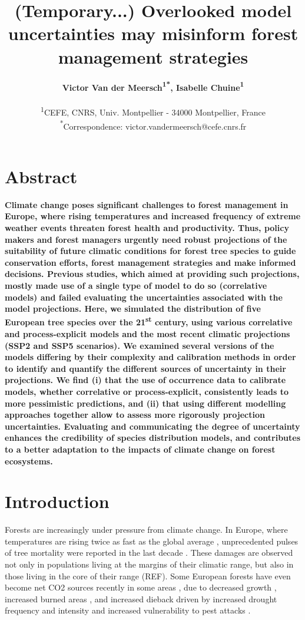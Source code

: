 \documentclass[letterpaper,8pt]{extarticle}  %
\title{(Temporary...) Overlooked model uncertainties may misinform forest management strategies}
\author{%
\textbf{Victor Van der Meersch\textcolor{Accent}{\textsuperscript{1*}}, %
Isabelle Chuine\textcolor{Accent}{\textsuperscript{1}} %
}\\
\begin{small}\textcolor{Accent}{\textsuperscript{1}}CEFE, CNRS, Univ. Montpellier - 34000 Montpellier, France \\ 
\textcolor{Accent}{\textsuperscript{*}}Correspondence: \textcolor{Accent}{victor.vandermeersch@cefe.cnrs.fr} \\ \end{small}
}
\date{}
\begin{document}
\maketitle

\section*{Abstract}

\begin{doublespacing}
\begin{linenumbers}

\noindent
\textbf{Climate change poses significant challenges to forest management in Europe, where rising temperatures and increased frequency of extreme weather events threaten forest health and productivity. Thus, policy makers and forest managers urgently need robust projections of the suitability of future climatic conditions for forest tree species to guide conservation efforts, forest management strategies and make informed decisions. Previous studies, which aimed at providing such projections, mostly made use of a single type of model to do so (correlative models) and failed evaluating the uncertainties associated with the model projections. Here, we simulated the distribution of five European tree species over the 21\textsuperscript{st} century, using various correlative and process-explicit models and the most recent climatic projections (SSP2 and SSP5 scenarios). We examined several versions of the models differing by their complexity and calibration methods in order to identify and quantify the different sources of uncertainty in their projections. We find (i) that the use of occurrence data to calibrate models, whether correlative or process-explicit, consistently leads to more pessimistic predictions, and (ii) that using different modelling approaches together allow to assess more rigorously projection uncertainties. Evaluating and communicating the degree of uncertainty enhances the credibility of species distribution models, and contributes to a better adaptation to the impacts of climate change on forest ecosystems.}

\section{Introduction}

Forests are increasingly under pressure from climate change. In Europe, where temperatures are rising twice as fast as the global average \citep{CCCS2024}, unprecedented pulses of tree mortality were reported in the last decade \citep{Senf2020}. These damages are observed not only in populations living at the margins of their climatic range, but also in those living in the core of their range (REF). Some European forests have even become net CO2 sources recently  in some areas \citep{Hadden2016, Karelin2021}, due to decreased growth \citep{Hadden2016, Woude2023}, increased burned areas \citep{Carnicer2022, Kelly2024}, and increased dieback driven by increased drought frequency and intensity and increased vulnerability to pest attacks \citep{Karelin2021, Cienciala2024, Latifovic2024}.


\end{linenumbers}
\end{doublespacing}
\end{document}
